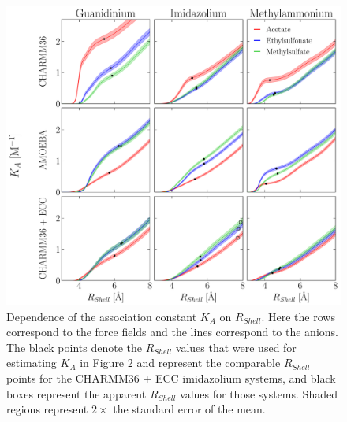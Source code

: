 \documentclass[journal=jacsat,articletitle=true,manuscript=suppinfo,layout=onecolumn]{achemso}
\begin{document}
    \begin{figure}[H]
    \begin{center}
        \includegraphics[width=1\columnwidth]{images/Ka_vs_Rshell_anion_comparison.pdf}
        \caption{Dependence of the association constant $K_{A}$ on $R_{Shell}$. Here the rows correspond to the force fields and the lines correspond to the anions. The black points denote the $R_{Shell}$ values that were used for estimating $K_{A}$ in Figure 2
        and represent the comparable $R_{Shell}$ points for the CHARMM36 + ECC imidazolium systems, and black boxes represent the apparent $R_{Shell}$ values for those systems. Shaded regions represent $2\times$ the standard error of the mean.}
        \label{fig:Ka_vs_Rshell}
    \end{center}
    \end{figure}
\end{document}
